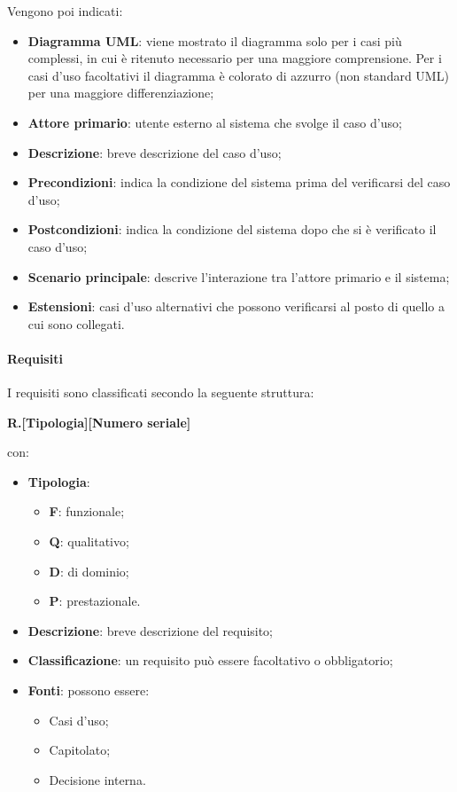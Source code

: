 \noindent Vengono poi indicati:
    \begin{itemize}
        \item \textbf{Diagramma UML}: viene mostrato il diagramma solo per i casi più complessi, in cui è ritenuto necessario per una maggiore comprensione. Per i casi d’uso facoltativi il diagramma è colorato di azzurro (non standard UML) per una maggiore differenziazione;
	    \item \textbf{Attore primario}: utente esterno al sistema che svolge il caso d’uso;
	    \item \textbf{Descrizione}: breve descrizione del caso d’uso;
	    \item \textbf{Precondizioni}: indica la condizione del sistema prima del verificarsi del caso d’uso;
	    \item \textbf{Postcondizioni}: indica la condizione del sistema dopo che si è verificato il caso d’uso;
	    \item \textbf{Scenario principale}: descrive l’interazione tra l’attore primario e il sistema;
	    \item \textbf{Estensioni}: casi d’uso alternativi che possono verificarsi al posto di quello a cui sono collegati. 
    \end{itemize}

\paragraph{Requisiti} 
I requisiti sono classificati secondo la seguente struttura: 

\begin{center}\textbf{R.[Tipologia][Numero seriale]}\end{center}

\noindent con:
    \begin{itemize}
        \item \textbf{Tipologia}: 
            \begin{itemize}
                \item \textbf{F}: funzionale;
                \item \textbf{Q}: qualitativo;
                \item \textbf{D}: di dominio;
                \item \textbf{P}: prestazionale.
            \end{itemize}
	    \item \textbf{Descrizione}: breve descrizione del requisito;
	    \item \textbf{Classificazione}: un requisito può essere facoltativo o obbligatorio;
	    \item \textbf{Fonti}: possono essere: 
            \begin{itemize}
                \item Casi d’uso;
                \item Capitolato;
                \item Decisione interna.
            \end{itemize}
    \end{itemize}

